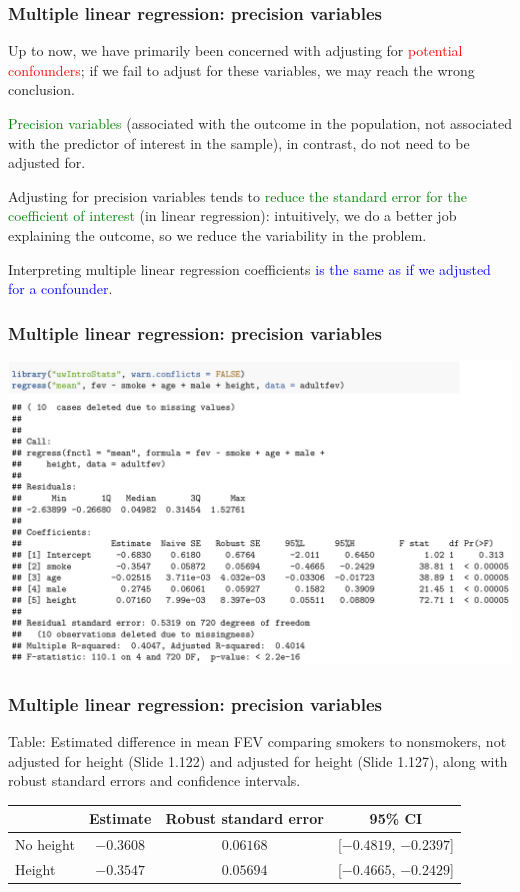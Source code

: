 \documentclass[12pt, 
hyperref={colorlinks=true, linkcolor=blue, urlcolor=cyan}]{beamer}
\begin{document}
\begin{frame}
\frametitle{Multiple linear regression: precision variables}

Up to now, we have primarily been concerned with adjusting for \textcolor{red}{potential confounders}; if we fail to adjust for these variables, we may reach the wrong conclusion.

\textcolor{green}{Precision variables} (associated with the outcome in the population, not associated with the predictor of interest in the sample), in contrast, do not need to be adjusted for.

Adjusting for precision variables tends to \textcolor{green}{reduce the standard error for the coefficient of interest} (in linear regression): intuitively, we do a better job explaining the outcome, so we reduce the variability in the problem. 

Interpreting multiple linear regression coefficients \textcolor{blue}{is the same as if we adjusted for a confounder}.
\end{frame}

\begin{frame}
\frametitle{Multiple linear regression: precision variables}
\begin{center}
\vspace{-1cm}\hspace*{-0.5cm}\includegraphics[width=1.1\textwidth]{plots/fev_vs_smoke_adjust_adultfev.png}
\end{center}

\end{frame}

\begin{frame}
\frametitle{Multiple linear regression: precision variables}
Table: Estimated difference in mean FEV comparing smokers to nonsmokers, not adjusted for height (Slide 1.122) and adjusted for height (Slide 1.127), along with robust standard errors and confidence intervals.

\hspace*{-1cm}\begin{tabular}{lccc}
\hline 
 & Estimate & Robust standard error & 95\% CI \\
 \hline 
No height & $-0.3608$ & $0.06168$  & [$-0.4819$, $-0.2397$]\\
Height & $-0.3547$ & $0.05694$ & [$-0.4665$, $-0.2429$]
\end{tabular}
\end{frame}
\end{document}
